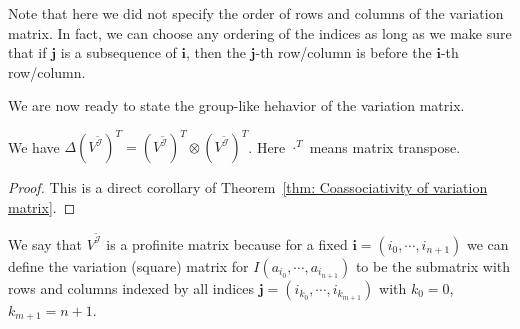 \begin{remark}
Note that here we did not specify the order of rows and columns of the variation matrix. In fact, we can choose any ordering of the indices as long as we make sure that if $\mathbf j$ is a subsequence of $\mathbf i$, then the $\mathbf j$-th row/column is before the $\mathbf i$-th row/column.
\end{remark}

We are now ready to state the group-like hehavior of the variation matrix.

\begin{theorem}\label{thm: V^I is group like}
We have $\Delta (V^{\widetilde{\mathcal  I}})^T=(V^{\widetilde{\mathcal  I}})^T\otimes (V^{\widetilde{\mathcal  I}})^T$. Here $\cdot^T$ means matrix transpose.
\end{theorem}

\begin{proof}
This is a direct corollary of Theorem~\ref{thm: Coassociativity of variation matrix}.
\end{proof}

We say that $V^{\widetilde{\mathcal  I}}$ is a profinite matrix because for a fixed $\mathbf i=(i_0,\cdots,i_{n+1})$ we can define the variation (square) matrix for $I(a_{i_0},\cdots,a_{i_{n+1}})$ to be the submatrix with rows and columns indexed by all indices $\mathbf j=(i_{k_0},\cdots,i_{k_{m+1}})$ with $k_0=0$, $k_{m+1}=n+1$.

